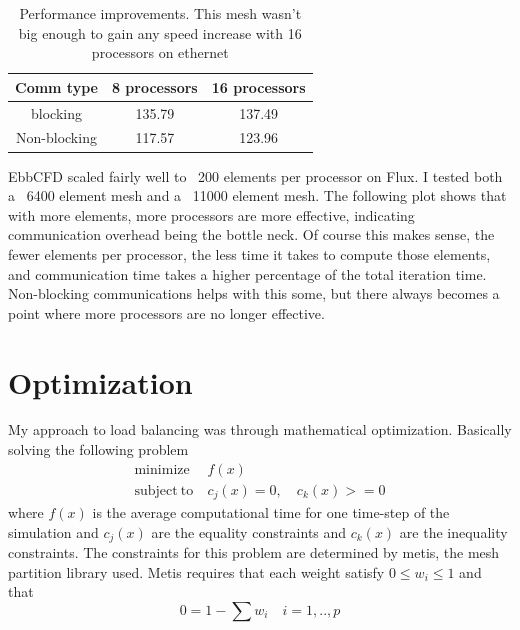 \documentclass[12pt,parskip=full]{article}
\numberwithin{subsection}{section}
\begin{document}
		\begin{table}
			\centering
			\begin{tabular}{ c | c | c}
				Comm type & 8 processors & 16 processors \\ \hline
				blocking & 135.79 & 137.49 \\
				Non-blocking & 117.57 & 123.96 \\ 
			\end{tabular}
			\caption{Performance improvements. This mesh wasn't big enough to gain any speed increase with 16 processors on ethernet}
		\end{table}

		EbbCFD scaled fairly well to ~200 elements per processor on Flux. I tested both a ~6400 element mesh and a ~11000 element mesh. The following
		plot shows that with more elements, more processors are more effective, indicating communication overhead being the
		bottle neck. Of course this makes sense, the fewer elements per processor, the less time it takes to compute those elements,
		and communication time takes a higher percentage of the total iteration time. Non-blocking communications helps with this
		some, but there always becomes a point where more processors are no longer effective. 
		
		\begin{figure}[H]
			\centering
			\begin{subfigure}[H]{0.3\textwidth}
			\end{subfigure}
			\begin{subfigure}[H]{0.3\textwidth}
			\end{subfigure}
		\end{figure}

	\section{Optimization}
		My approach to load balancing was through mathematical optimization. Basically solving the following problem
		\begin{align}
			\mathrm{minimize \ }& f(x) \\
			\mathrm{subject \ to \ } & c_j(x) = 0, \quad c_k(x) >= 0
		\end{align}
		where $f(x)$ is the average computational time for one time-step of the simulation and $c_j(x)$ are the equality constraints and 
		$c_k(x)$ are the inequality constraints. The constraints for this problem are determined by metis, the mesh partition library used.
		Metis requires that each weight satisfy $0 \le w_i \le 1$ and that
		\begin{equation}
			0 = 1 - \sum{w_i} \quad i = 1,..,p
		\end{equation}
		
\end{document}
